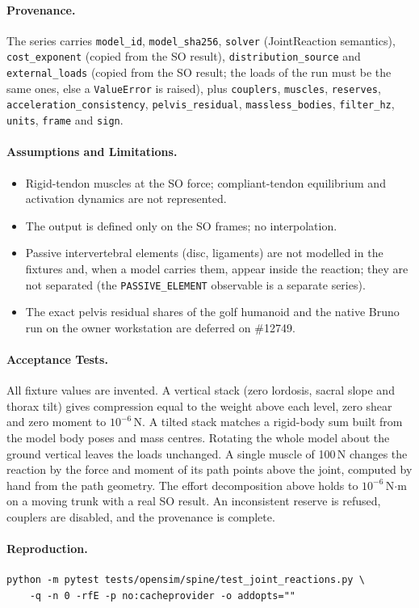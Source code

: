 \paragraph{Provenance.}
The series carries \texttt{model\_id}, \texttt{model\_sha256}, \texttt{solver}
(JointReaction semantics), \texttt{cost\_exponent} (copied from the SO result),
\texttt{distribution\_source} and \texttt{external\_loads} (copied from the SO
result; the loads of the run must be the same ones, else a \texttt{ValueError}
is raised), plus \texttt{couplers}, \texttt{muscles}, \texttt{reserves},
\texttt{acceleration\_consistency}, \texttt{pelvis\_residual},
\texttt{massless\_bodies}, \texttt{filter\_hz}, \texttt{units}, \texttt{frame}
and \texttt{sign}.

\paragraph{Assumptions and Limitations.}
\begin{itemize}
  \item Rigid-tendon muscles at the SO force; compliant-tendon equilibrium and
        activation dynamics are not represented.
  \item The output is defined only on the SO frames; no interpolation.
  \item Passive intervertebral elements (disc, ligaments) are not modelled in
        the fixtures and, when a model carries them, appear inside the
        reaction; they are not separated (the \texttt{PASSIVE\_ELEMENT}
        observable is a separate series).
  \item The exact pelvis residual shares of the golf humanoid and the native
        Bruno run on the owner workstation are deferred on \#12749.
\end{itemize}

\paragraph{Acceptance Tests.}
All fixture values are invented. A vertical stack (zero lordosis, sacral slope
and thorax tilt) gives compression equal to the weight above each level, zero
shear and zero moment to $10^{-6}$\,N. A tilted stack matches a rigid-body
sum built from the model body poses and mass centres. Rotating the whole model
about the ground vertical leaves the loads unchanged. A single muscle of
100\,N changes the reaction by the force and moment of its path points above
the joint, computed by hand from the path geometry. The effort decomposition
above holds to $10^{-6}$\,N$\cdot$m on a moving trunk with a real SO result.
An inconsistent reserve is refused, couplers are disabled, and the provenance
is complete.

\paragraph{Reproduction.}
\begin{verbatim}
python -m pytest tests/opensim/spine/test_joint_reactions.py \
    -q -n 0 -rfE -p no:cacheprovider -o addopts=""
\end{verbatim}
